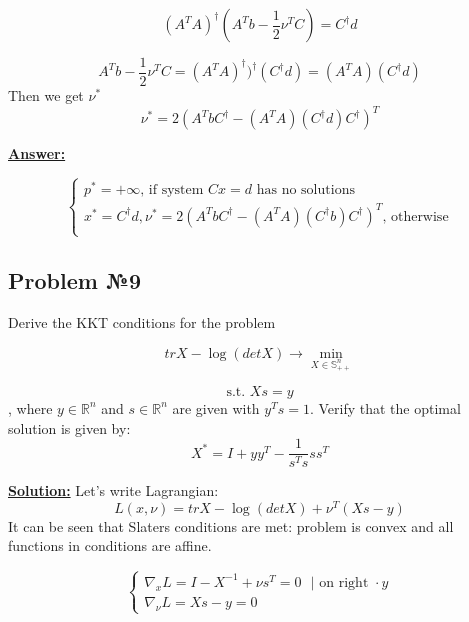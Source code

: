 \begin{equation*}
(A^TA)^{\dag}(A^Tb - \frac{1}{2}\nu^TC) = C^{\dag}d
\end{equation*}

\begin{equation*}
    A^Tb - \frac{1}{2}\nu^TC = (A^TA)^{\dag})^{\dag} (C^{\dag}d) = (A^TA)(C^{\dag}d)
\end{equation*}
Then we get $\nu^*$
\begin{equation*}
    \nu^* = 2(A^TbC^{\dag} - (A^TA)(C^{\dag}d)C^{\dag})^T
\end{equation*}

\underline{\textbf{Answer:}}

\begin{equation*}
    \begin{cases}
        p^* = +\infty \text{, if system } Cx = d \text{ has no solutions}  \\
        x^* = C^{\dag}d, \nu^* = 2(A^TbC^{\dag} - (A^TA)(C^{\dag}b)C^{\dag})^T \text{, otherwise} \\
    \end{cases}
\end{equation*}

\subsection{Problem №9}
Derive the KKT conditions for the problem 

\begin{equation*}
    trX - \log (detX) \xrightarrow{} \min\limits_{X \in \mathds{S}_{++}^n}
\end{equation*}

\begin{equation*}
   \text{s.t. } Xs = y
\end{equation*}
, where $y \in \mathds{R}^n$ and $s \in \mathds{R}^n$ are given with $y^Ts = 1$. Verify that the optimal solution is given by:
\begin{equation*}
    X^* = I + yy^T - \frac{1}{s^Ts}ss^T
\end{equation*}

\underline{\textbf{Solution:}}
Let's write Lagrangian:
\begin{equation*}
    L(x, \nu) = trX  - \log (detX) + \nu^T(Xs - y)
\end{equation*}
It can be seen that Slaters conditions are met: problem is convex and all functions in conditions are affine.

\begin{equation*}
    \begin{cases}
        \nabla_x L = I - X^{-1} + \nu s^T = 0 \text{ } | \text{ on right }  \cdot y \\ 
        \nabla_{\nu} L = Xs - y = 0
    \end{cases}
\end{equation*}

